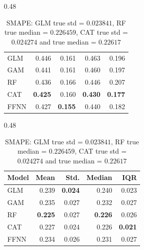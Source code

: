 \begin{table}[ht]
\begin{subtable}{0.48\textwidth}
\begin{tabular}{lrrrr}
\midrule
GLM & 0.446 & 0.161 & 0.463 & 0.196 \\
GAM & 0.441 & 0.161 & 0.460 & 0.197 \\
RF  & 0.436 & 0.166 & 0.446 & 0.207 \\
CAT & \textbf{0.425} & 0.160 & \textbf{0.430} & \textbf{0.177} \\
FFNN  & 0.427 & \textbf{0.155} & 0.440 & 0.182 \\
\bottomrule
\end{tabular}
\end{subtable}
\hfill
\begin{subtable}{0.48\textwidth}
\centering
\small
\caption{SMAPE: GLM true std = \(0.023841\), RF true median = \(0.226459\), CAT true std = \(0.024274\) and true median = \(0.22617\)}\label{tab:smape-random-cv-test}
\begin{tabular}{lrrrr}
\toprule
\textbf{Model} & \textbf{Mean} & \textbf{Std.} & \textbf{Median} & \textbf{IQR} \\
\midrule
GLM & 0.239 & \textbf{0.024} & 0.240 & 0.023 \\
GAM & 0.235 & 0.027 & 0.232 & 0.027 \\
RF  & \textbf{0.225} & 0.027 & \textbf{0.226} & 0.026 \\
CAT & 0.227 & 0.024 & 0.226 & \textbf{0.021} \\
FFNN  & 0.234 & 0.026 & 0.231 & 0.027 \\
\bottomrule
\end{tabular}
\end{subtable}
\end{table}

